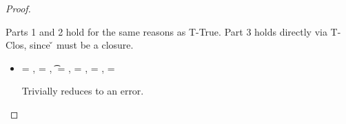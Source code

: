 \begin{lemma}
\begin{proof}
\begin{case}[B-Abs]
\begin{itemize}
\begin{subcase}[T-Abs]
        Parts 1 and 2 hold for the same reasons as T-True.
        Part 3 holds directly via T-Clos, since \v{} must be a closure.
      \end{subcase}
  \end{itemize}
\end{case}

\begin{case}[BE-Error]
        \opsem {\openv{}} {\e{}} {}


  \begin{itemize}
    \item[]
      \begin{subcase}[T-Error] 
  \ep{} = ,
  \e{} = ,
  \t{} = \Bot,
  \thenprop{\prop{}} = \botprop{}, \elseprop{\prop{}} = \botprop{}, \object{} = \emptyobject{}

        Trivially reduces to an error.
      \end{subcase}
  \end{itemize}
\end{case}

\end{proof}

\end{lemma}

{}

{}
